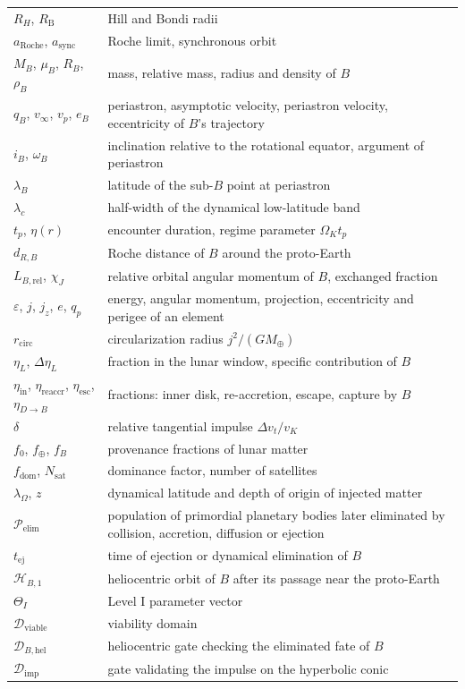 \documentclass[11pt,a4paper,openany]{report}
\newcommand{\Mt}{M_{\oplus}}
\newcommand{\aR}{a_{\mathrm{Roche}}}
\begin{document}
\begin{longtable}{>{\raggedright\arraybackslash}p{3.2cm}>{\raggedright\arraybackslash}p{11.6cm}}
$R_H$, $R_{\mathrm{B}}$ & Hill and Bondi radii \\
$\aR$, $a_{\mathrm{sync}}$ & Roche limit, synchronous orbit \\
$M_B$, $\mu_B$, $R_B$, $\rho_B$ & mass, relative mass, radius and density of $B$ \\
$q_B$, $v_\infty$, $v_p$, $e_B$ & periastron, asymptotic velocity, periastron velocity, eccentricity of $B$'s trajectory \\
$i_B$, $\omega_B$ & inclination relative to the rotational equator, argument of periastron \\
$\lambda_B$ & latitude of the sub-$B$ point at periastron \\
$\lambda_c$ & half-width of the dynamical low-latitude band \\
$t_{p}$, $\eta(r)$ & encounter duration, regime parameter $\Omega_Kt_{p}$ \\
$d_{R,B}$ & Roche distance of $B$ around the proto-Earth \\
$L_{B,\mathrm{rel}}$, $\chi_J$ & relative orbital angular momentum of $B$, exchanged fraction \\
$\varepsilon$, $j$, $j_z$, $e$, $q_p$ & energy, angular momentum, projection, eccentricity and perigee of an element \\
$r_{\mathrm{circ}}$ & circularization radius $j^2/(G\Mt)$ \\
$\eta_L$, $\Delta\eta_L$ & fraction in the lunar window, specific contribution of $B$ \\
$\eta_{\mathrm{in}}$, $\eta_{\mathrm{reaccr}}$, $\eta_{\mathrm{esc}}$, $\eta_{D\to B}$ & fractions: inner disk, re-accretion, escape, capture by $B$ \\
$\delta$ & relative tangential impulse $\Delta v_t/v_K$ \\
$f_0$, $f_\oplus$, $f_B$ & provenance fractions of lunar matter \\
$f_{\mathrm{dom}}$, $N_{\mathrm{sat}}$ & dominance factor, number of satellites \\
$\lambda_\Omega$, $z$ & dynamical latitude and depth of origin of injected matter \\
$\mathcal{P}_{\mathrm{elim}}$ & population of primordial planetary bodies later eliminated by collision, accretion, diffusion or ejection \\
$t_{\mathrm{ej}}$ & time of ejection or dynamical elimination of $B$ \\
$\mathcal{H}_{B,1}$ & heliocentric orbit of $B$ after its passage near the proto-Earth \\
$\Theta_I$ & Level I parameter vector \\
$\mathcal{D}_{\mathrm{viable}}$ & viability domain \\
$\mathcal{D}_{B,\mathrm{hel}}$ & heliocentric gate checking the eliminated fate of $B$ \\
$\mathcal{D}_{\mathrm{imp}}$ & gate validating the impulse on the hyperbolic conic \\
\bottomrule
\end{longtable}
\normalsize
\end{document}
